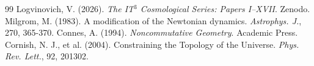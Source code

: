 \documentclass[12pt, a4paper]{article}
\begin{document}
\begin{thebibliography}{99}
 Logvinovich, V. (2026). \textit{The IT$^3$ Cosmological Series: Papers I--XVII}. Zenodo.
 Milgrom, M. (1983). A modification of the Newtonian dynamics. \textit{Astrophys. J.}, 270, 365-370.
 Connes, A. (1994). \textit{Noncommutative Geometry}. Academic Press.
 Cornish, N. J., et al. (2004). Constraining the Topology of the Universe. \textit{Phys. Rev. Lett.}, 92, 201302.
\end{thebibliography}
\end{document}
